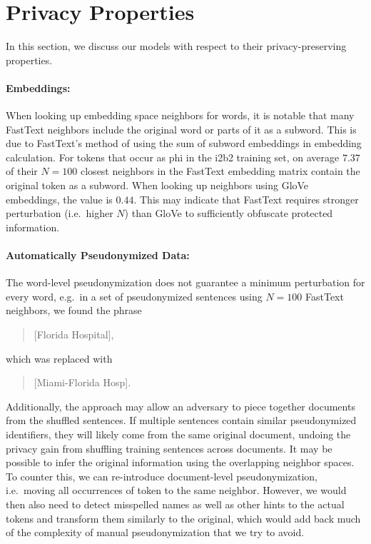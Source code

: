 \section{Privacy Properties}

In this section, we discuss our models with respect to their privacy-preserving properties.

\paragraph{Embeddings:}
%
When looking up embedding space neighbors for words, it is notable that many FastText neighbors include the original word or parts of it as a subword.
%
This is due to FastText's method of using the sum of subword embeddings in embedding calculation.
%
For tokens that occur as \ac{phi} in the i2b2 training set, on average $7.37$ of their $N=100$ closest neighbors in the FastText embedding matrix contain the original token as a subword.
%
When looking up neighbors using GloVe embeddings, the value is $0.44$.
%
This may indicate that FastText requires stronger perturbation (i.e.\ higher $N$) than GloVe to sufficiently obfuscate protected information.

\paragraph{Automatically Pseudonymized Data:}
%
The word-level pseudonymization does not guarantee a minimum perturbation for every word, e.g.\ in a set of pseudonymized sentences using $N = 100$ FastText neighbors, we found the phrase
%
\begin{quote}
    [Florida Hospital],
\end{quote}
%
which was replaced with
%
\begin{quote}
    [Miami-Florida Hosp].
\end{quote}

%
Additionally, the approach may allow an adversary to piece together documents from the shuffled sentences.
%
If multiple sentences contain similar pseudonymized identifiers, they will likely come from the same original document, undoing the privacy gain from shuffling training sentences across documents.
%
It may be possible to infer the original information using the overlapping neighbor spaces.
%
To counter this, we can re-introduce document-level pseudonymization, i.e.\ moving all occurrences of  token to the same neighbor.
%
However, we would then also need to detect misspelled names as well as other hints to the actual tokens and transform them similarly to the original, which would add back much of the complexity of manual pseudonymization that we try to avoid.

